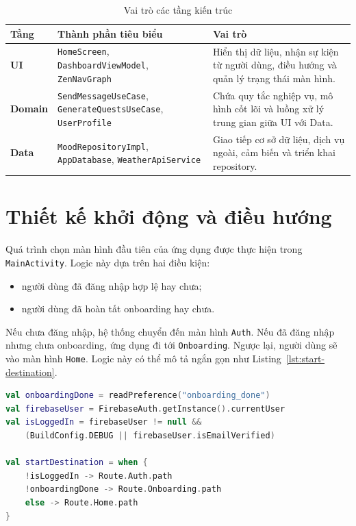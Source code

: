 \documentclass{zenbuddy-report}
\begin{document}
\begin{table}[H]
\centering
\caption{Vai trò các tầng kiến trúc}
\label{tab:layers}
\begin{tabularx}{\textwidth}{>{\bfseries}p{2.7cm}p{4cm}X}
\toprule
Tầng & Thành phần tiêu biểu & Vai trò \\
\midrule
UI & \texttt{HomeScreen}, \texttt{DashboardViewModel}, \texttt{ZenNavGraph} & Hiển thị dữ liệu, nhận sự kiện từ người dùng, điều hướng và quản lý trạng thái màn hình. \\
Domain & \texttt{SendMessageUseCase}, \texttt{GenerateQuestsUseCase}, \texttt{UserProfile} & Chứa quy tắc nghiệp vụ, mô hình cốt lõi và luồng xử lý trung gian giữa UI với Data. \\
Data & \texttt{MoodRepositoryImpl}, \texttt{AppDatabase}, \texttt{WeatherApiService} & Giao tiếp cơ sở dữ liệu, dịch vụ ngoài, cảm biến và triển khai repository. \\
\bottomrule
\end{tabularx}
\end{table}

\section{Thiết kế khởi động và điều hướng}
Quá trình chọn màn hình đầu tiên của ứng dụng được thực hiện trong \texttt{MainActivity}. Logic này dựa trên hai điều kiện:
\begin{itemize}
  \item người dùng đã đăng nhập hợp lệ hay chưa;
  \item người dùng đã hoàn tất onboarding hay chưa.
\end{itemize}

Nếu chưa đăng nhập, hệ thống chuyển đến màn hình \texttt{Auth}. Nếu đã đăng nhập nhưng chưa onboarding, ứng dụng đi tới \texttt{Onboarding}. Ngược lại, người dùng sẽ vào màn hình \texttt{Home}. Logic này có thể mô tả ngắn gọn như Listing~\ref{lst:start-destination}.

\begin{lstlisting}[language=Kotlin,caption={Pseudocode xác định màn hình khởi động},label={lst:start-destination}]
val onboardingDone = readPreference("onboarding_done")
val firebaseUser = FirebaseAuth.getInstance().currentUser
val isLoggedIn = firebaseUser != null &&
    (BuildConfig.DEBUG || firebaseUser.isEmailVerified)

val startDestination = when {
    !isLoggedIn -> Route.Auth.path
    !onboardingDone -> Route.Onboarding.path
    else -> Route.Home.path
}
\end{lstlisting}
\end{document}
